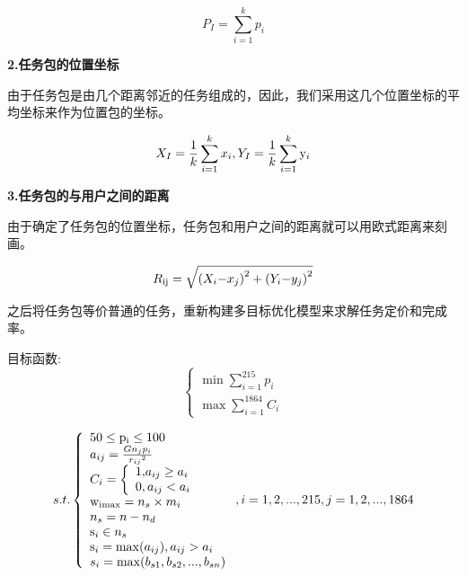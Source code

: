 \documentclass[withoutpreface,bwprint]{cumcmthesis} %
\begin{document}
\begin{equation}
{P_I} = \sum\limits_{i = 1}^k {{p_i}} 
\end{equation}

\textbf{2.任务包的位置坐标}

由于任务包是由几个距离邻近的任务组成的，因此，我们采用这几个位置坐标的平均坐标来作为位置包的坐标。

\begin{equation}
{X_I} = \frac{{\rm{1}}}{k}\sum\limits_{i = 1}^k {{x_i}} ,{Y_I} = \frac{{\rm{1}}}{k}\sum\limits_{i = 1}^k {{{\rm{y}}_i}} 
\end{equation}

\textbf{3.任务包的与用户之间的距离}

由于确定了任务包的位置坐标，任务包和用户之间的距离就可以用欧式距离来刻画。

\begin{equation}
{R_{{\rm{ij}}}} = \sqrt {{{\left( {{X_i}{\rm{ - }}{x_j}} \right)}^2} + {{\left( {{Y_i}{\rm{ - }}{y_j}} \right)}^2}} 
\end{equation}

之后将任务包等价普通的任务，重新构建多目标优化模型来求解任务定价和完成率。

目标函数:
\begin{equation}
\left\{ \begin{array}{l}
\min \sum\limits_{i = 1}^{215} {{p_i}} \\
\max \sum\limits_{i = 1}^{1864} {{C_i}} 
\end{array} \right.
\end{equation}

\begin{equation}
s.t.\left\{ \begin{array}{l}
{\rm{50}} \le {\rm{p}}{}_{\rm{i}} \le 100\\
{a_{ij}} = \frac{{G{n_j}{p_i}}}{{{r_{ij}}^2}}\\
{C_i} = \left\{ \begin{array}{l}
{\rm{1,}}{a_{ij}} \ge {a_i}\\
0,{a_{ij}} < {a_i}
\end{array} \right.\\
{{\rm{w}}_{{\rm{imax}}}} = {n_s} \times {m_i}\\
{n_s} = n - {n_d}\\
{{\rm{s}}_i} \in {n_s}\\
{{\rm{s}}_i} = \max ({a_{ij}}),{a_{ij}} > {a_i}\\
{s_i} = \max ({b_{s1}},{b_{s2}},...,{b_{sn}})
\end{array} \right.,i = 1,2,...,215,j = 1,2,...,1864
\end{equation}
\end{document}
